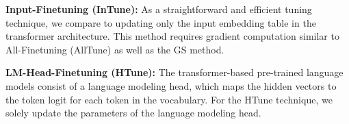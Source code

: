 \documentclass[11pt]{article}
\begin{document}

\textbf{Input-Finetuning (InTune):} As a straightforward and efficient tuning technique, we compare to updating only the input embedding table in the transformer architecture. This method requires gradient computation similar to All-Finetuning (AllTune) as well as the GS method. 

\textbf{LM-Head-Finetuning (HTune):} The transformer-based pre-trained language models consist of a language modeling head, which maps the hidden vectors to the token logit for each token in the vocabulary. For the HTune technique, we solely update the parameters of the language modeling head. 
\end{document}

